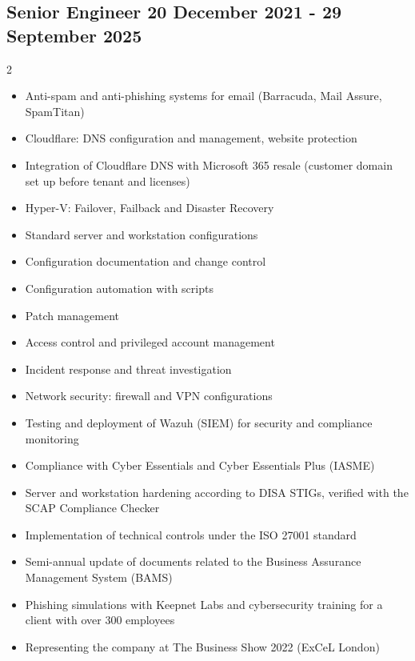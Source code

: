 \documentclass[a4paper, 10pt]{article}
\begin{document}
	\subsection*{Senior Engineer \hfill \normalsize 20 December 2021 - 29 September 2025}
	\begin{multicols}{2}
		\raggedright
		\begin{itemize}
		\item Anti-spam and anti-phishing systems for email (Barracuda, Mail Assure, SpamTitan)
		
		\item Cloudflare: DNS configuration and management, website protection
		
		\item Integration of Cloudflare DNS with Microsoft 365 resale (customer domain set up before tenant and licenses)
		
		\item Hyper-V: Failover, Failback and Disaster Recovery
		
		\item Standard server and workstation configurations
		
		\item Configuration documentation and change control
		
		\item Configuration automation with scripts
		
		\item Patch management
		
		\item Access control and privileged account management
		
		\item Incident response and threat investigation
		
		\item Network security: firewall and VPN configurations
		
		\item Testing and deployment of Wazuh (SIEM) for security and compliance monitoring
		
		\item Compliance with Cyber Essentials and Cyber Essentials Plus (IASME)
		
		\item Server and workstation hardening according to DISA STIGs, verified with the SCAP Compliance Checker
		
		\item Implementation of technical controls under the ISO 27001 standard
		
		\item Semi-annual update of documents related to the Business Assurance Management System (BAMS)
		
		\item Phishing simulations with Keepnet Labs and cybersecurity training for a client with over 300 employees
		
		\item Representing the company at The Business Show 2022 (ExCeL London)
		\end{itemize}
	\end{multicols}
	
\end{document}
